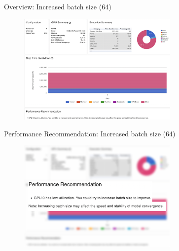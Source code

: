 \documentclass[compress,aspectratio=169]{beamer}
\begin{document}
\begin{frame}{Overview: Increased batch size (64)}
	\vspace{-1em}
\begin{center}
    \begin{figure}
        \includegraphics[width=0.7\textwidth]{../../data/scap_gtx1080_profiler-torch_batch-size-64_14650758}
    \end{figure}
    \end{center}

\end{frame}

\begin{frame}{Performance Recommendation: Increased batch size (64)}
	\vspace{-1em}
\begin{center}
    \begin{figure}
        \includegraphics[width=0.7\textwidth]{../../data/scap_gtx1080_profiler-torch_batch-size-64_14650758_zoom}
    \end{figure}
    \end{center}

\end{frame}
\end{document}
